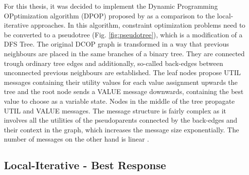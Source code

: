 For this thesis, it was decided to implement the Dynamic Programming OPptimization algorithm (DPOP) proposed by \cite{Petcu2003} as a comparison to the local-iterative approaches. In this algorithm, constraint optimization problems need to be converted to a pseudotree (Fig. \ref{fig:pseudotree}), which is a modification of a DFS Tree. The original DCOP graph is transformed in a way that previous neighbours are placed in the same branches of a binary tree. They are connected trough ordinary tree edges and additionally, so-called back-edges between unconnected previous neighbours are established. The leaf nodes propose UTIL messages containing their utility values for each value assignment upwards the tree and the root node sends a VALUE message downwards, containing the best value to choose as a variable state. Nodes in the middle of the tree propagate UTIL and VALUE messages. The message structure is fairly complex as it involves all the utilities of the pseudoparents connected by the back-edges and their context in the graph, which increases the message size exponentially. The number of messages on the other hand is linear \cite{Petcu2003}.

\subsection{Local-Iterative - Best Response}

